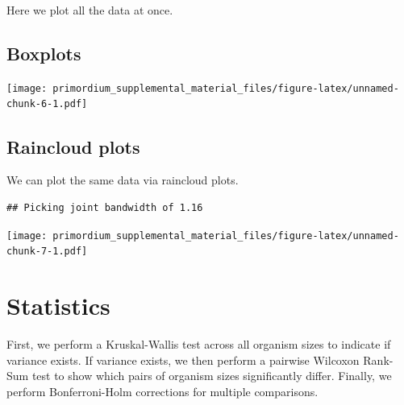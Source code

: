 \documentclass[
]{book}
\begin{document}
Here we plot all the data at once.

\hypertarget{boxplots}{%
\subsection{Boxplots}\label{boxplots}}

\texttt{[image: primordium\_supplemental\_material\_files/figure-latex/unnamed-chunk-6-1.pdf]}

\hypertarget{raincloud-plots}{%
\subsection{Raincloud plots}\label{raincloud-plots}}

We can plot the same data via raincloud plots.

\begin{verbatim}
## Picking joint bandwidth of 1.16
\end{verbatim}

\texttt{[image: primordium\_supplemental\_material\_files/figure-latex/unnamed-chunk-7-1.pdf]}

\hypertarget{statistics}{%
\section{Statistics}\label{statistics}}

First, we perform a Kruskal-Wallis test across all organism sizes to indicate if variance exists.
If variance exists, we then perform a pairwise Wilcoxon Rank-Sum test to show which pairs of organism sizes significantly differ.
Finally, we perform Bonferroni-Holm corrections for multiple comparisons.
\end{document}
